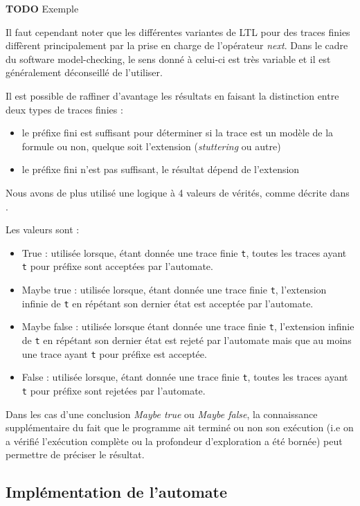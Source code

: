 \textbf{TODO} Exemple

Il faut cependant noter que les différentes variantes de LTL pour des
traces finies diffèrent principalement par la prise en charge de
l'opérateur \emph{next}. Dans le cadre du software model-checking, le
sens donné à celui-ci est très variable et il est généralement
déconseillé de l'utiliser.

Il est possible de raffiner d'avantage les résultats en faisant la
distinction entre deux types de traces finies :

\begin{itemize}
\item
  le préfixe fini est suffisant pour déterminer si la trace est un
  modèle de la formule ou non, quelque soit l'extension
  (\emph{stuttering} ou autre)
\item
  le préfixe fini n'est pas suffisant, le résultat dépend de l'extension
\end{itemize}

Nous avons de plus utilisé une logique à 4 valeurs de vérités, comme
décrite dans \cite{morse_ltl}.

Les valeurs sont :

\begin{itemize}
\item
  True : utilisée lorsque, étant donnée une trace finie \texttt{t},
  toutes les traces ayant \texttt{t} pour préfixe sont acceptées par
  l'automate.
\item
  Maybe true : utilisée lorsque, étant donnée une trace finie
  \texttt{t}, l'extension infinie de \texttt{t} en répétant son
  dernier état est acceptée par l'automate.
\item
  Maybe false : utilisée lorsque étant donnée une trace finie
  \texttt{t}, l'extension infinie de \texttt{t} en répétant son
  dernier état est rejeté par l'automate mais que au moins une trace
  ayant \texttt{t} pour préfixe est acceptée.
\item
  False : utilisée lorsque, étant donnée une trace finie \texttt{t},
  toutes les traces ayant \texttt{t} pour préfixe sont rejetées par
  l'automate.
\end{itemize}

Dans les cas d'une conclusion \emph{Maybe true} ou \emph{Maybe false},
la connaissance supplémentaire du fait que le programme ait terminé ou
non son exécution (i.e on a vérifié l'exécution complète ou la
profondeur d'exploration a été bornée) peut permettre de préciser le
résultat.

\subsection{Implémentation de l'automate}


